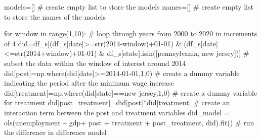 \documentclass[
  letterpaper,
  DIV=11,
  numbers=noendperiod]{scrreprt}
\newenvironment{Shaded}{\begin{snugshade}}{\end{snugshade}}
\newcommand{\BuiltInTok}[1]{\textcolor[rgb]{0.00,0.23,0.31}{#1}}
\newcommand{\CommentTok}[1]{\textcolor[rgb]{0.37,0.37,0.37}{#1}}
\newcommand{\ControlFlowTok}[1]{\textcolor[rgb]{0.00,0.23,0.31}{#1}}
\newcommand{\DecValTok}[1]{\textcolor[rgb]{0.68,0.00,0.00}{#1}}
\newcommand{\KeywordTok}[1]{\textcolor[rgb]{0.00,0.23,0.31}{#1}}
\newcommand{\NormalTok}[1]{\textcolor[rgb]{0.00,0.23,0.31}{#1}}
\newcommand{\OperatorTok}[1]{\textcolor[rgb]{0.37,0.37,0.37}{#1}}
\newcommand{\StringTok}[1]{\textcolor[rgb]{0.13,0.47,0.30}{#1}}
\begin{document}
\begin{Shaded}
\begin{Highlighting}[]
\NormalTok{models}\OperatorTok{=}\NormalTok{[] }\CommentTok{\# create empty list to store the models}
\NormalTok{names}\OperatorTok{=}\NormalTok{[] }\CommentTok{\# create empty list to store the names of the models}

\ControlFlowTok{for}\NormalTok{ window }\KeywordTok{in} \BuiltInTok{range}\NormalTok{(}\DecValTok{1}\NormalTok{,}\DecValTok{10}\NormalTok{): }\CommentTok{\# loop through years from 2000 to 2020 in increments of 4}
\NormalTok{    did}\OperatorTok{=}\NormalTok{df\_s[(df\_s[}\StringTok{\textquotesingle{}date\textquotesingle{}}\NormalTok{]}\OperatorTok{\textgreater{}=}\BuiltInTok{str}\NormalTok{(}\DecValTok{2014}\OperatorTok{{-}}\NormalTok{window)}\OperatorTok{+}\StringTok{\textquotesingle{}{-}01{-}01\textquotesingle{}}\NormalTok{) }\OperatorTok{\&}\NormalTok{ (df\_s[}\StringTok{\textquotesingle{}date\textquotesingle{}}\NormalTok{]}\OperatorTok{\textless{}=}\BuiltInTok{str}\NormalTok{(}\DecValTok{2014}\OperatorTok{+}\NormalTok{window)}\OperatorTok{+}\StringTok{\textquotesingle{}{-}01{-}01\textquotesingle{}}\NormalTok{) }\OperatorTok{\&}\NormalTok{ df\_s[}\StringTok{\textquotesingle{}state\textquotesingle{}}\NormalTok{].isin([}\StringTok{\textquotesingle{}pennsylvania\textquotesingle{}}\NormalTok{, }\StringTok{\textquotesingle{}new jersey\textquotesingle{}}\NormalTok{])] }\CommentTok{\# subset the data within the window of interest around 2014}
\NormalTok{    did[}\StringTok{\textquotesingle{}post\textquotesingle{}}\NormalTok{]}\OperatorTok{=}\NormalTok{np.where(did[}\StringTok{\textquotesingle{}date\textquotesingle{}}\NormalTok{]}\OperatorTok{\textgreater{}=}\StringTok{\textquotesingle{}2014{-}01{-}01\textquotesingle{}}\NormalTok{,}\DecValTok{1}\NormalTok{,}\DecValTok{0}\NormalTok{) }\CommentTok{\# create a dummy variable indicating the period after the minimum wage increase}
\NormalTok{    did[}\StringTok{\textquotesingle{}treatment\textquotesingle{}}\NormalTok{]}\OperatorTok{=}\NormalTok{np.where(did[}\StringTok{\textquotesingle{}state\textquotesingle{}}\NormalTok{]}\OperatorTok{==}\StringTok{\textquotesingle{}new jersey\textquotesingle{}}\NormalTok{,}\DecValTok{1}\NormalTok{,}\DecValTok{0}\NormalTok{) }\CommentTok{\# create a dummy variable for treatment}
\NormalTok{    did[}\StringTok{\textquotesingle{}post\_treatment\textquotesingle{}}\NormalTok{]}\OperatorTok{=}\NormalTok{did[}\StringTok{\textquotesingle{}post\textquotesingle{}}\NormalTok{]}\OperatorTok{*}\NormalTok{did[}\StringTok{\textquotesingle{}treatment\textquotesingle{}}\NormalTok{] }\CommentTok{\# create an interaction term between the post and treatment variables}
\NormalTok{    did\_model }\OperatorTok{=}\NormalTok{ ols(}\StringTok{\textquotesingle{}unemployment \textasciitilde{} gdp+ post + treatment + post\_treatment\textquotesingle{}}\NormalTok{, did).fit() }\CommentTok{\# run the difference in difference model}


\end{Highlighting}
\end{Shaded}
\end{document}
